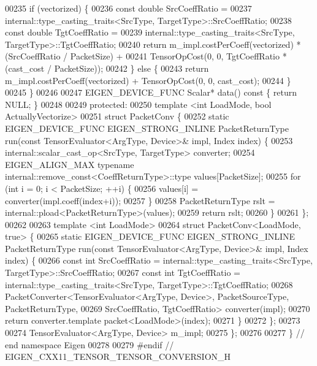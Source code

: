 \begin{DoxyCode}
00235     \textcolor{keywordflow}{if} (vectorized) \{
00236       \textcolor{keyword}{const} \textcolor{keywordtype}{double} SrcCoeffRatio =
00237           internal::type\_casting\_traits<SrcType, TargetType>::SrcCoeffRatio;
00238       \textcolor{keyword}{const} \textcolor{keywordtype}{double} TgtCoeffRatio =
00239           internal::type\_casting\_traits<SrcType, TargetType>::TgtCoeffRatio;
00240       \textcolor{keywordflow}{return} m\_impl.costPerCoeff(vectorized) * (SrcCoeffRatio / PacketSize) +
00241           TensorOpCost(0, 0, TgtCoeffRatio * (cast\_cost / PacketSize));
00242     \} \textcolor{keywordflow}{else} \{
00243       \textcolor{keywordflow}{return} m\_impl.costPerCoeff(vectorized) + TensorOpCost(0, 0, cast\_cost);
00244     \}
00245   \}
00246 
00247   EIGEN\_DEVICE\_FUNC Scalar* data()\textcolor{keyword}{ const }\{ \textcolor{keywordflow}{return} NULL; \}
00248 
00249   \textcolor{keyword}{protected}:
00250   \textcolor{keyword}{template} <\textcolor{keywordtype}{int} LoadMode, \textcolor{keywordtype}{bool} ActuallyVectorize>
00251   \textcolor{keyword}{struct }PacketConv \{
00252     \textcolor{keyword}{static} EIGEN\_DEVICE\_FUNC EIGEN\_STRONG\_INLINE PacketReturnType run(\textcolor{keyword}{const} TensorEvaluator<ArgType,
       Device>& impl, Index index) \{
00253       internal::scalar\_cast\_op<SrcType, TargetType> converter;
00254       EIGEN\_ALIGN\_MAX \textcolor{keyword}{typename} internal::remove\_const<CoeffReturnType>::type values[PacketSize];
00255       \textcolor{keywordflow}{for} (\textcolor{keywordtype}{int} i = 0; i < PacketSize; ++i) \{
00256         values[i] = converter(impl.coeff(index+i));
00257       \}
00258       PacketReturnType rslt = internal::pload<PacketReturnType>(values);
00259       \textcolor{keywordflow}{return} rslt;
00260     \}
00261   \};
00262 
00263   \textcolor{keyword}{template} <\textcolor{keywordtype}{int} LoadMode>
00264   \textcolor{keyword}{struct }PacketConv<LoadMode, true> \{
00265     \textcolor{keyword}{static} EIGEN\_DEVICE\_FUNC EIGEN\_STRONG\_INLINE PacketReturnType run(\textcolor{keyword}{const} TensorEvaluator<ArgType,
       Device>& impl, Index index) \{
00266       \textcolor{keyword}{const} \textcolor{keywordtype}{int} SrcCoeffRatio = internal::type\_casting\_traits<SrcType, TargetType>::SrcCoeffRatio;
00267       \textcolor{keyword}{const} \textcolor{keywordtype}{int} TgtCoeffRatio = internal::type\_casting\_traits<SrcType, TargetType>::TgtCoeffRatio;
00268       PacketConverter<TensorEvaluator<ArgType, Device>, PacketSourceType, PacketReturnType,
00269                       SrcCoeffRatio, TgtCoeffRatio> converter(impl);
00270       \textcolor{keywordflow}{return} converter.template packet<LoadMode>(index);
00271     \}
00272   \};
00273 
00274   TensorEvaluator<ArgType, Device> m\_impl;
00275 \};
00276 
00277 \} \textcolor{comment}{// end namespace Eigen}
00278 
00279 \textcolor{preprocessor}{#endif // EIGEN\_CXX11\_TENSOR\_TENSOR\_CONVERSION\_H}
\end{DoxyCode}
